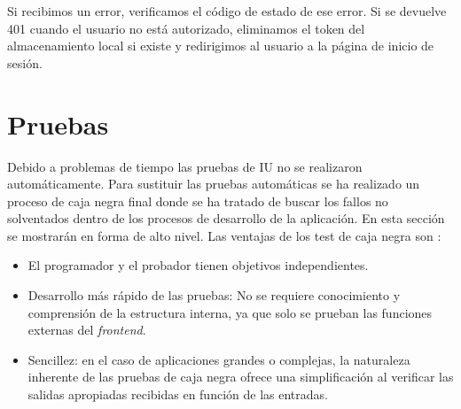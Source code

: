 Si recibimos un error, verificamos el código de estado de ese error. Si se devuelve 401 cuando el usuario no está autorizado, eliminamos el token del almacenamiento local si existe y redirigimos al usuario a la página de inicio de sesión.



\section{Pruebas}
Debido a problemas de tiempo las pruebas de IU no se realizaron automáticamente. Para sustituir las pruebas automáticas se ha realizado un proceso de caja negra final donde se ha tratado de buscar los fallos no solventados dentro de los procesos de desarrollo de la aplicación. En esta sección se mostrarán en forma de alto nivel. Las ventajas de los test de caja negra son :

\begin{itemize}
\item El programador y el probador tienen objetivos independientes.
\item Desarrollo más rápido de las pruebas: No se requiere conocimiento y comprensión de la estructura interna, ya que solo se prueban las funciones externas del \textit{frontend}.
\item Sencillez: en el caso de aplicaciones grandes o complejas, la naturaleza inherente de las pruebas de caja negra ofrece una simplificación al verificar las salidas apropiadas recibidas en función de las entradas.
\end{itemize}

